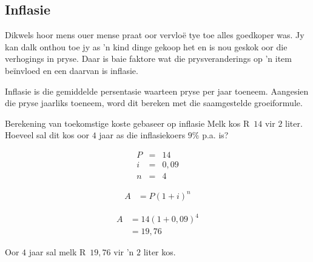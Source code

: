 \subsection{Inflasie}

Dikwels hoor mens ouer mense praat oor vervlo\"e tye toe alles goedkoper was. Jy kan dalk onthou toe jy as 'n kind dinge gekoop het en is nou geskok oor die verhogings in pryse. Daar is baie faktore wat die prysveranderings op 'n item be\"invloed en een daarvan is inflasie.\par

Inflasie is die gemiddelde persentasie waarteen pryse per jaar toeneem. Aangesien die pryse jaarliks toeneem, word dit bereken met die saamgestelde groeiformule.\par




\begin{wex}{Berekening van toekomstige koste gebaseer op inflasie}
    {Melk kos R~$14$ vir $2$ liter. Hoeveel sal dit kos oor $4$ jaar as die inflasiekoers $9\%$ p.a. is?}{
    
    \begin{eqnarray*}
	P &=& 14\\
	i &=& 0,09\\
	n &=& 4
    \end{eqnarray*}

    \begin{align*}
	A &= P(1 + i)^n
    \end{align*}

    \begin{align*}
	A &= 14(1 + 0,09)^4\\
	  &= 19,76
    \end{align*}

    Oor $4$ jaar sal melk R~$19,76$ vir 'n $2$ liter kos.
    }
\end{wex}


